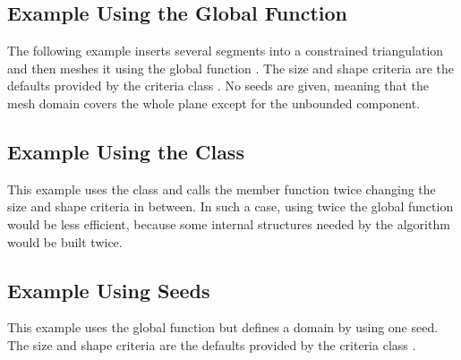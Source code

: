 \subsection{Example Using the Global Function}

The following example inserts several segments into a constrained
triangulation and then meshes it using the global function
. The size and shape criteria are the defaults
provided by the criteria class . No seeds are
given, meaning that the mesh domain covers the whole plane except for the
unbounded component.


\subsection{Example Using the Class \protect{}}

This example uses the class  and calls
  the  member function twice changing the size and
  shape criteria in between. In such a case, using twice the global
  function  would be less efficient,
  because some internal structures needed by the algorithm would be
  built twice.


\subsection{Example Using Seeds}

This example uses the global function  but
defines a domain by using one seed. The size and shape criteria are the
defaults provided by the criteria class .


